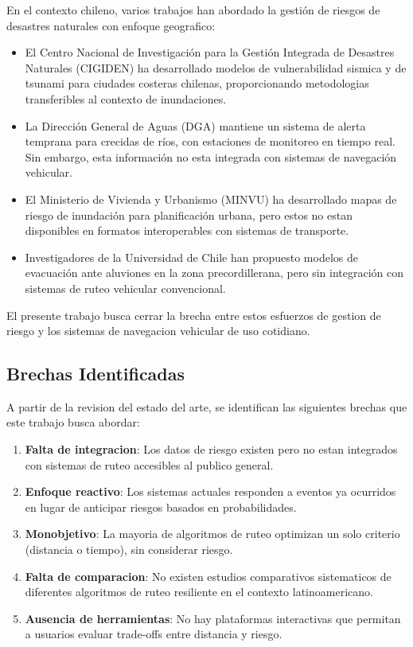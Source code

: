 \documentclass[conference]{IEEEtran}
\begin{document}
En el contexto chileno, varios trabajos han abordado la gestión de riesgos de desastres naturales con enfoque geografico:

\begin{itemize}
    \item El Centro Nacional de Investigación para la Gestión Integrada de Desastres Naturales (CIGIDEN) ha desarrollado modelos de vulnerabilidad sismica y de tsunami para ciudades costeras chilenas, proporcionando metodologias transferibles al contexto de inundaciones.

    \item La Dirección General de Aguas (DGA) mantiene un sistema de alerta temprana para crecidas de ríos, con estaciones de monitoreo en tiempo real. Sin embargo, esta información no esta integrada con sistemas de navegación vehicular.

    \item El Ministerio de Vivienda y Urbanismo (MINVU) ha desarrollado mapas de riesgo de inundación para planificación urbana, pero estos no estan disponibles en formatos interoperables con sistemas de transporte.

    \item Investigadores de la Universidad de Chile han propuesto modelos de evacuación ante aluviones en la zona precordillerana, pero sin integración con sistemas de ruteo vehicular convencional.
\end{itemize}

El presente trabajo busca cerrar la brecha entre estos esfuerzos de gestion de riesgo y los sistemas de navegacion vehicular de uso cotidiano.

\subsection{Brechas Identificadas}

A partir de la revision del estado del arte, se identifican las siguientes brechas que este trabajo busca abordar:

\begin{enumerate}
    \item \textbf{Falta de integracion}: Los datos de riesgo existen pero no estan integrados con sistemas de ruteo accesibles al publico general.

    \item \textbf{Enfoque reactivo}: Los sistemas actuales responden a eventos ya ocurridos en lugar de anticipar riesgos basados en probabilidades.

    \item \textbf{Monobjetivo}: La mayoria de algoritmos de ruteo optimizan un solo criterio (distancia o tiempo), sin considerar riesgo.

    \item \textbf{Falta de comparacion}: No existen estudios comparativos sistematicos de diferentes algoritmos de ruteo resiliente en el contexto latinoamericano.

    \item \textbf{Ausencia de herramientas}: No hay plataformas interactivas que permitan a usuarios evaluar trade-offs entre distancia y riesgo.
\end{enumerate}
\end{document}
